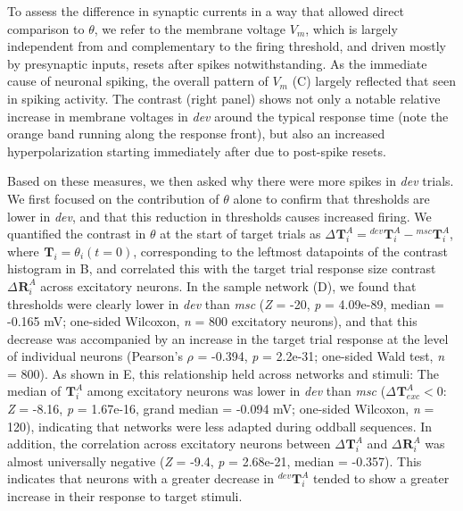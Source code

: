 \documentclass[9pt,lineno,onehalfspacing]{elife}
\newcommand{\dev}{\textit{dev}}
\newcommand{\msc}{\textit{msc}}
\newcommand{\R}[3][]{{}^{#1}_{}\boldsymbol R^{#2}_{#3}}
\newcommand{\T}[3][]{{}^{#1}_{}\boldsymbol T^{#2}_{#3}}
\begin{document}
To assess the difference in synaptic currents in a way that allowed direct comparison to $\theta$, we refer to the membrane voltage $V_m$, which is largely independent from and complementary to the firing threshold, and driven mostly by presynaptic inputs, resets after spikes notwithstanding. As the immediate cause of neuronal spiking, the overall pattern of $V_m$ (C) largely reflected that seen in spiking activity. The contrast (right panel) shows not only a notable relative increase in membrane voltages in \dev{} around the typical response time (note the orange band running along the response front), but also an increased hyperpolarization starting immediately after due to post-spike resets.

Based on these measures, we then asked why there were more spikes in \dev{} trials. We first focused on the contribution of $\theta$ alone to confirm that thresholds are lower in \dev{}, and that this reduction in thresholds causes increased firing. We quantified the contrast in $\theta$ at the start of target trials as $\Delta \T{A}{i} = \T[dev]{A}{i} - \T[msc]{A}{i}$, where $\T{}{i} = \theta_i(t=0)$, corresponding to the leftmost datapoints of the contrast histogram in B, and correlated this with the target trial response size contrast $\Delta \R{A}{i}$ across excitatory neurons. In the sample network (D), we found that thresholds were clearly lower in \dev{} than \msc{} (\textit{Z} = -20, \textit{p} = 4.09e-89, median = -0.165 mV; one-sided Wilcoxon, \textit{n} = 800 excitatory neurons), and that this decrease was accompanied by an increase in the target trial response at the level of individual neurons (Pearson's $\rho$ = -0.394, \textit{p} = 2.2e-31; one-sided Wald test, \textit{n} = 800). As shown in E, this relationship held across networks and stimuli: The median of $\T{A}{i}$ among excitatory neurons was lower in \dev{} than \msc{} ($\Delta \T{A}{exc} < 0$: \textit{Z} = -8.16, \textit{p} = 1.67e-16, grand median = -0.094 mV; one-sided Wilcoxon, \textit{n} = 120), indicating that networks were less adapted during oddball sequences. In addition, the correlation across excitatory neurons between $\Delta \T{A}{i}$ and $\Delta \R{A}{i}$ was almost universally negative (\textit{Z} = -9.4, \textit{p} = 2.68e-21, median = -0.357). This indicates that neurons with a greater decrease in $\T[dev]{A}{i}$ tended to show a greater increase in their response to target stimuli.
\end{document}
